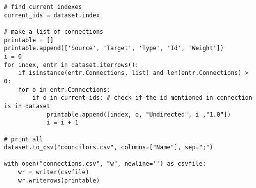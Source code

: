 \begin{small}
\begin{verbatim}
# find current indexes
current_ids = dataset.index

# make a list of connections
printable = []
printable.append(['Source', 'Target', 'Type', 'Id', 'Weight'])
i = 0
for index, entr in dataset.iterrows():
    if isinstance(entr.Connections, list) and len(entr.Connections) > 0:
    for o in entr.Connections:
        if o in current_ids: # check if the id mentioned in connection is in dataset
            printable.append([index, o, "Undirected", i ,"1.0"])
            i = i + 1

# print all
dataset.to_csv("councilors.csv", columns=["Name"], sep=";")

with open("connections.csv", "w", newline='') as csvfile:
    wr = writer(csvfile)
    wr.writerows(printable)
\end{verbatim}
\end{small}
